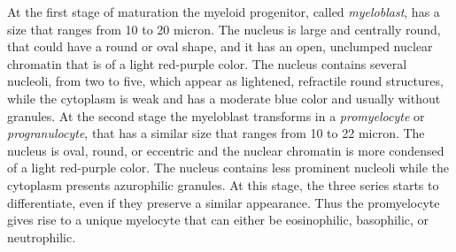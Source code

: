 \documentclass[final,a4paper,12pt,english]{UnicaPhdThesis3}
\begin{document}
{At the first stage of maturation the myeloid progenitor, called \textit{myeloblast}, has a size that ranges from 10 to 20 micron. The nucleus is large and centrally round, that could have a round or oval shape, and it has an open, unclumped nuclear chromatin that is of a light red-purple color. The nucleus contains several nucleoli, from two to five, which appear as lightened, refractile round structures, while the cytoplasm is weak and has a moderate blue color and usually without granules. At the second stage the myeloblast transforms in a \textit{promyelocyte} or \textit{progranulocyte}, that has a similar size that ranges from 10 to 22 micron. The nucleus is oval, round, or eccentric and the nuclear chromatin is more condensed of a light red-purple color. The nucleus contains less prominent nucleoli while the cytoplasm presents azurophilic granules. At this stage, the three series starts to differentiate, even if they preserve a similar appearance. Thus the promyelocyte gives rise to a unique myelocyte that can either be eosinophilic, basophilic, or neutrophilic.
}
\end{document}
